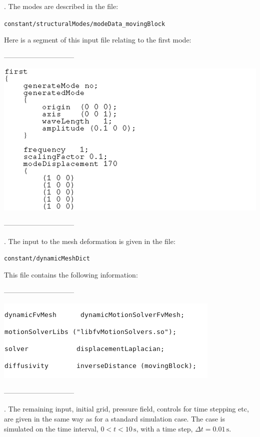\vspace{0.2cm}

. The modes are described in the file:

\texttt{constant/structuralModes/modeData\_movingBlock}

\noindent Here is a segment of this input file relating to the first mode:

------------------------------

\includegraphics[width=0.7\linewidth]{figures/ml/data1}

------------------------------

\vspace{0.2cm}

. The input to the mesh deformation is given in the file:

\texttt{constant/dynamicMeshDict}

\noindent This file contains the following information:

------------------------------

\includegraphics[width=0.55\linewidth]{figures/ml/data2}

------------------------------

\vspace{0.2cm}

. The remaining input, initial grid, pressure field, controls for time stepping etc,
are given in the same way as for a standard simulation case.
The case is simulated on the time interval, $0<t<10\,\mbox{s}$, with a time
step, $\Delta t = 0.01\,\mbox{s}$.

